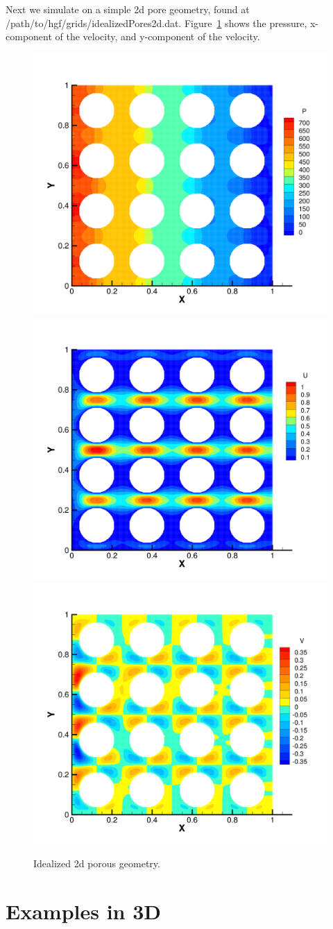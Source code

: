 \documentclass{report}
\begin{document}
\noindent Next we simulate on a simple 2d pore geometry, found at /path/to/hgf/grids/idealizedPores2d.dat.
Figure~\ref{fig:2dellipse} shows the pressure, x-component of the velocity, and
y-component of the velocity.
\begin{figure}
  \centering
  \includegraphics[width=.49\textwidth]{images/ellipseRepeat2dP.png}
  \includegraphics[width=.49\textwidth]{images/ellipseRepeat2dU.png}\\
  \includegraphics[width=.5\textwidth]{images/ellipseRepeat2dV.png}
  \caption{\label{fig:2dellipse}Idealized 2d porous geometry.}
\end{figure}

\section{Examples in 3D}
\end{document}
